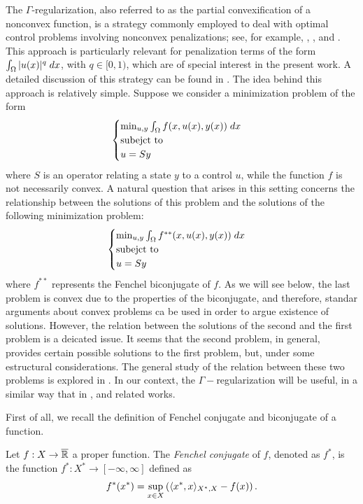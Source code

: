 The $\Gamma$-regularization, also referred to as the partial convexification of a 
nonconvex function, is a strategy commonly employed to deal with optimal control 
problems involving nonconvex penalizations; see, for example, 
\cite[Remark 2.6]{ito-kunisch2014}, \cite{casasl0}, and \cite{wachsmuth2019}. 
This approach is particularly relevant for penalization terms of the 
form $\int_{\Omega} |u(x)|^q\; dx$, with $q\in [0,1)$, which are of special interest
 in the present work. A detailed discussion of this strategy can be found in 
 \cite[Chapter 9]{ekeland}. The idea behind this approach is relatively simple. Suppose we consider a minimization problem of the form 
\[ 
\begin{cases} \min_{u,y}\int_{\Omega}f(x, u(x), y(x))\; dx\\ \mbox{subejct to} \\
u=Sy \end{cases}
\]
where $S$ is an operator relating a state $y$ to a control $u$, while the function $f$ is not necessarily convex. A natural question that arises in this setting concerns the relationship between the solutions of this problem and the solutions of the following minimization problem:
\begin{equation}\label{eq:problem_biconjugate}
\begin{cases} \min_{u,y}\int_{\Omega}f^{**}(x, u(x), y(x))\; dx\\ \mbox{subejct to}\\
u=Sy \end{cases}
\end{equation}
where $f^{**}$ represents the Fenchel biconjugate of $f$. As we will see below, the last problem is convex due to the properties of the biconjugate, and therefore, standar arguments about convex problems ca be used in order to argue existence of solutions. However, the relation between the solutions of the second and the first problem is a deicated issue. It seems that the second problem, in general, provides certain possible solutions to the first problem, but, under some estructural considerations. The general study of the relation between these two problems is explored in \cite[Chapter 9]{ekeland}. In our context, the $\Gamma-$regularization will be useful, in a similar way that in \cite{ito-kunisch2014, wachsmuth2019, casasl0}, and related works.

First of all, we recall the definition of Fenchel conjugate and biconjugate of a function.

\begin{definition}\label{def:fench_conj}
     Let $f:X\to \overline{\mathbb{R}}$ a proper function. The \textit{Fenchel conjugate} of $f$, denoted as $f^*$, is the function $f^*:X^*\to [-\infty,\infty]$ defined as
     \[
     f^*(x^*)=\sup_{x\in X}\left( \langle x^*,x\rangle_{X^*,X}-f(x)\right).
     \]
 \end{definition}

